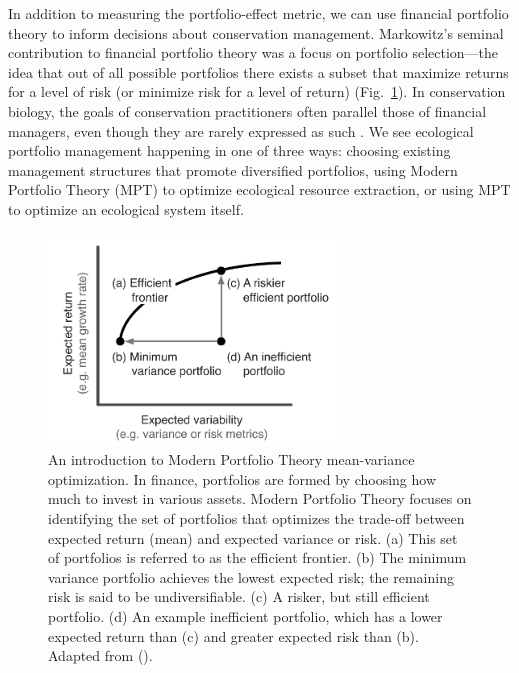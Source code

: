 In addition to measuring the portfolio-effect metric, we can use financial portfolio theory to inform decisions about conservation management. Markowitz's seminal contribution to financial portfolio theory was a focus on portfolio selection---the idea that out of all possible portfolios there exists a subset that maximize returns for a level of risk (or minimize risk for a level of return) \citep{markowitz1952} (Fig.~\ref{fig:mpt}). In conservation biology, the goals of conservation practitioners often parallel those of financial managers, even though they are rarely expressed as such \citep{figge2004}. We see ecological portfolio management happening in one of three ways: choosing existing management structures that promote diversified portfolios, using Modern Portfolio Theory (MPT) to optimize ecological resource extraction, or using MPT to optimize an ecological system itself.

\begin{figure}[htbp]
\centering
\includegraphics[width=3in]{efficient-frontier-fig.pdf}
\caption[An introduction to Modern Portfolio Theory mean-variance optimization.]{
An introduction to Modern Portfolio Theory mean-variance optimization. In
finance, portfolios are formed by choosing how much to invest in various
assets. Modern Portfolio Theory focuses on identifying the set of portfolios
that optimizes the trade-off between expected return (mean) and expected
variance or risk. (a) This set of portfolios is referred to as the efficient
frontier. (b) The minimum variance portfolio achieves the lowest expected
risk; the remaining risk is said to be undiversifiable. (c) A risker, but
still efficient portfolio. (d) An example inefficient portfolio, which has a
lower expected return than (c) and greater expected risk than (b). Adapted
from \citeauthor{hoekstra2012} (\citeyear{hoekstra2012}).
}
\label{fig:mpt}
\end{figure}

